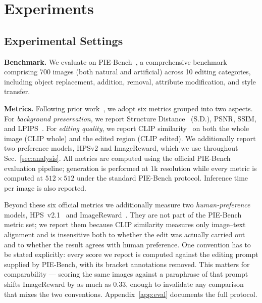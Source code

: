 \section{Experiments}
\label{section:exp}


\subsection{Experimental Settings}

\noindent\textbf{Benchmark.}
We evaluate on PIE-Bench~\cite{PIEBench}, a comprehensive benchmark comprising 700 images (both natural and artificial) across 10 editing categories, including object replacement, addition, removal, attribute modification, and style transfer.

\noindent\textbf{Metrics.}
Following prior work~\cite{PIEBench,AREdit}, we adopt six metrics grouped into two aspects. For \textit{background preservation}, we report Structure Distance~\cite{PIEBench} (S.D.), PSNR, SSIM, and LPIPS~\cite{LPIPS}. For \textit{editing quality}, we report CLIP similarity~\cite{CLIP} on both the whole image (CLIP whole) and the edited region (CLIP edited). We additionally report two preference models, HPSv2 and ImageReward, which we use throughout Sec.~\ref{sec:analysis}. All metrics are computed using the official PIE-Bench evaluation pipeline; generation is performed at 1k resolution while every metric is computed at $512\times512$ under the standard PIE-Bench protocol. Inference time per image is also reported.

Beyond these six official metrics we additionally measure two \textit{human-preference} models, HPS~v2.1~\cite{hpsv2} and ImageReward~\cite{imagereward}. They are not part of the PIE-Bench metric set; we report them because CLIP similarity measures only image--text alignment and is insensitive both to whether the edit was actually carried out and to whether the result agrees with human preference. One convention has to be stated explicitly: every score we report is computed against the editing prompt supplied by PIE-Bench, with its bracket annotations removed. This matters for comparability --- scoring the same images against a paraphrase of that prompt shifts ImageReward by as much as $0.33$, enough to invalidate any comparison that mixes the two conventions. Appendix~\ref{app:eval} documents the full protocol.

